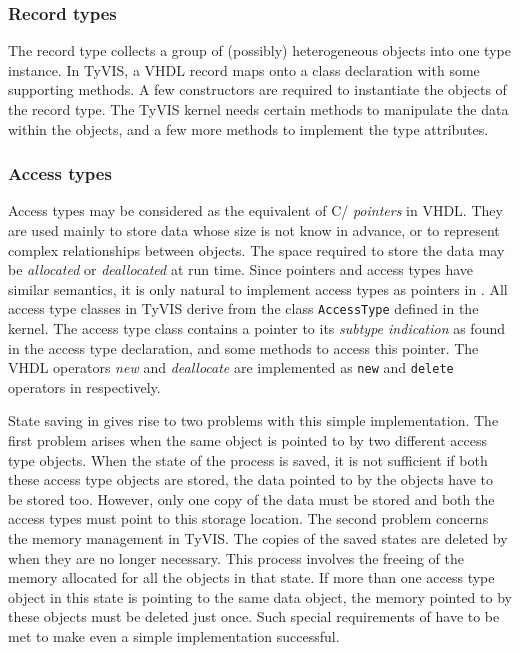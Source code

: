\documentclass[11pt]{article}
\begin{document}
\subsubsection{Record types}

The record type collects a group of (possibly) heterogeneous objects
into one type instance.  In TyVIS, a VHDL record maps onto a class
declaration with some supporting methods.  A few constructors are
required to instantiate the objects of the record type.  The TyVIS
kernel needs certain methods to manipulate the data within the
objects, and a few more methods to implement the type attributes.

\subsubsection{Access types}

Access types may be considered as the equivalent of C/\Cpp\/
\textit{pointers} in VHDL.  They are used mainly to store data whose
size is not know in advance, or to represent complex relationships
between objects.  The space required to store the data may be
\textit{allocated} or \textit{deallocated} at run time.  Since
pointers and access types have similar semantics, it is only natural
to implement access types as pointers in \Cpp\/.  All access type
classes in TyVIS derive from the class \texttt{AccessType} defined in
the kernel.  The access type class contains a pointer to its
\textit{subtype indication} as found in the access type declaration,
and some methods to access this pointer.  The VHDL operators
\textit{new} and \textit{deallocate} are implemented as
\texttt{new} and \texttt{delete} operators in \Cpp\/ respectively.

State saving in \warped\/ gives rise to two problems with this simple
implementation.  The first problem arises when the same object is
pointed to by two different access type objects.  When the state of
the process is saved, it is not sufficient if both these access type
objects are stored, the data pointed to by the objects have to be
stored too.  However, only one copy of the data must be stored and
both the access types must point to this storage location.  The second
problem concerns the memory management in TyVIS.  The copies of the
saved states are deleted by \warped\/ when they are no longer
necessary.  This process involves the freeing of the memory allocated
for all the objects in that state.  If more than one access type
object in this state is pointing to the same data object, the memory
pointed to by these objects must be deleted just once.  Such special
requirements of \warped\/ have to be met to make even a simple
implementation successful.
\end{document}
